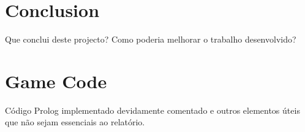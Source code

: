 \documentclass[a4paper]{article}
\begin{document}
\section{Conclusion}
Que conclui deste projecto? Como poderia melhorar o trabalho desenvolvido?




\clearpage
{}
\renewcommand\refname{Bibliografia}



\newpage
\appendix
\section{Game Code}
Código Prolog implementado devidamente comentado e outros elementos úteis que não sejam essenciais ao relatório.
\end{document}
